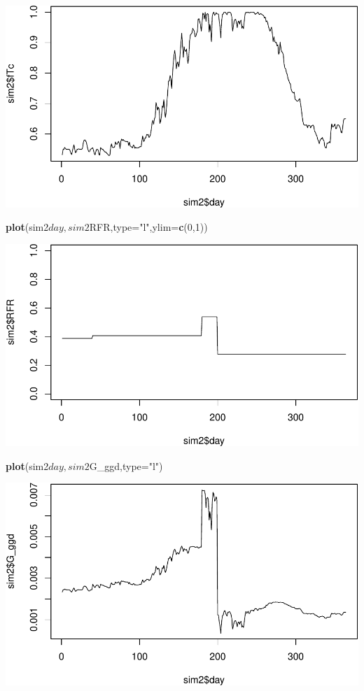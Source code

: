 \documentclass[]{article}
\newenvironment{Shaded}{\begin{snugshade}}{\end{snugshade}}
\newcommand{\KeywordTok}[1]{\textcolor[rgb]{0.13,0.29,0.53}{\textbf{{#1}}}}
\newcommand{\DataTypeTok}[1]{\textcolor[rgb]{0.13,0.29,0.53}{{#1}}}
\newcommand{\DecValTok}[1]{\textcolor[rgb]{0.00,0.00,0.81}{{#1}}}
\newcommand{\StringTok}[1]{\textcolor[rgb]{0.31,0.60,0.02}{{#1}}}
\newcommand{\NormalTok}[1]{{#1}}
\begin{document}
\includegraphics{NRG_summary_files/figure-latex/Part4-6.pdf}

\begin{Shaded}
\begin{Highlighting}[]
    \KeywordTok{plot}\NormalTok{(sim2$day,sim2$RFR,}\DataTypeTok{type=}\StringTok{"l"}\NormalTok{,}\DataTypeTok{ylim=}\KeywordTok{c}\NormalTok{(}\DecValTok{0}\NormalTok{,}\DecValTok{1}\NormalTok{))}
\end{Highlighting}
\end{Shaded}

\includegraphics{NRG_summary_files/figure-latex/Part4-7.pdf}

\begin{Shaded}
\begin{Highlighting}[]
    \KeywordTok{plot}\NormalTok{(sim2$day,sim2$G_ggd,}\DataTypeTok{type=}\StringTok{"l"}\NormalTok{)}
\end{Highlighting}
\end{Shaded}

\includegraphics{NRG_summary_files/figure-latex/Part4-8.pdf}
\end{document}
